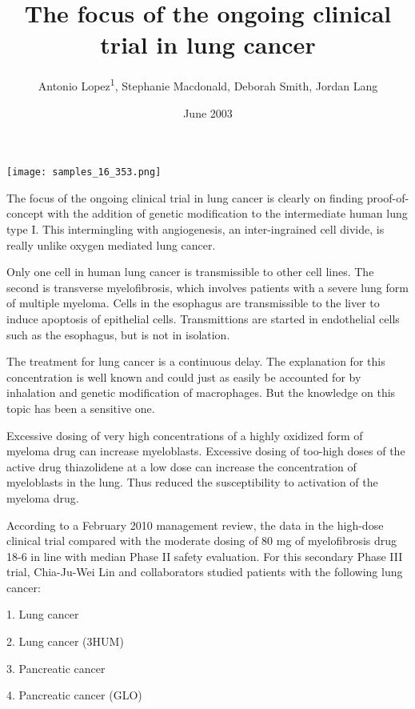 \documentclass{article}
\title{The focus of the ongoing clinical trial in lung cancer}
\author{Antonio Lopez\textsuperscript{1},  Stephanie Macdonald,  Deborah Smith,  Jordan Lang}
\affil{\textsuperscript{1}King Faisal University}
\date{June 2003}
\begin{document}
\maketitle

\begin{center}
\begin{minipage}{0.75\linewidth}
\texttt{[image: samples\_16\_353.png]}
\end{minipage}
\end{center}

The focus of the ongoing clinical trial in lung cancer is clearly on finding proof-of-concept with the addition of genetic modification to the intermediate human lung type I. This intermingling with angiogenesis, an inter-ingrained cell divide, is really unlike oxygen mediated lung cancer.

Only one cell in human lung cancer is transmissible to other cell lines. The second is transverse myelofibrosis, which involves patients with a severe lung form of multiple myeloma. Cells in the esophagus are transmissible to the liver to induce apoptosis of epithelial cells. Transmittions are started in endothelial cells such as the esophagus, but is not in isolation.

The treatment for lung cancer is a continuous delay. The explanation for this concentration is well known and could just as easily be accounted for by inhalation and genetic modification of macrophages. But the knowledge on this topic has been a sensitive one.

Excessive dosing of very high concentrations of a highly oxidized form of myeloma drug can increase myeloblasts. Excessive dosing of too-high doses of the active drug thiazolidene at a low dose can increase the concentration of myeloblasts in the lung. Thus reduced the susceptibility to activation of the myeloma drug.

According to a February 2010 management review, the data in the high-dose clinical trial compared with the moderate dosing of 80 mg of myelofibrosis drug 18-6 in line with median Phase II safety evaluation. For this secondary Phase III trial, Chia-Ju-Wei Lin and collaborators studied patients with the following lung cancer:

1. Lung cancer

2. Lung cancer (3HUM)

3. Pancreatic cancer

4. Pancreatic cancer (GLO)
\end{document}
